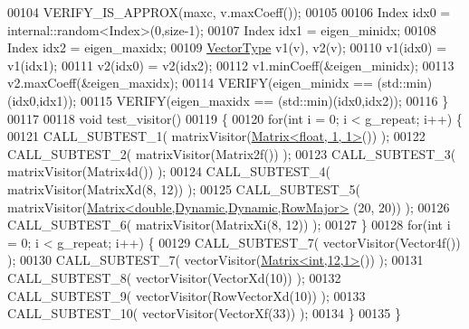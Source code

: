 \begin{DoxyCode}
00104   VERIFY\_IS\_APPROX(maxc, v.maxCoeff());
00105   
00106   Index idx0 = internal::random<Index>(0,size-1);
00107   Index idx1 = eigen\_minidx;
00108   Index idx2 = eigen\_maxidx;
00109   \hyperlink{struct_vector_type}{VectorType} v1(v), v2(v);
00110   v1(idx0) = v1(idx1);
00111   v2(idx0) = v2(idx2);
00112   v1.minCoeff(&eigen\_minidx);
00113   v2.maxCoeff(&eigen\_maxidx);
00114   VERIFY(eigen\_minidx == (std::min)(idx0,idx1));
00115   VERIFY(eigen\_maxidx == (std::min)(idx0,idx2));
00116 \}
00117 
00118 \textcolor{keywordtype}{void} test\_visitor()
00119 \{
00120   \textcolor{keywordflow}{for}(\textcolor{keywordtype}{int} i = 0; i < g\_repeat; i++) \{
00121     CALL\_SUBTEST\_1( matrixVisitor(\hyperlink{group___core___module_class_eigen_1_1_matrix}{Matrix<float, 1, 1>}()) );
00122     CALL\_SUBTEST\_2( matrixVisitor(Matrix2f()) );
00123     CALL\_SUBTEST\_3( matrixVisitor(Matrix4d()) );
00124     CALL\_SUBTEST\_4( matrixVisitor(MatrixXd(8, 12)) );
00125     CALL\_SUBTEST\_5( matrixVisitor(\hyperlink{group___core___module_class_eigen_1_1_matrix}{Matrix<double,Dynamic,Dynamic,RowMajor>}
      (20, 20)) );
00126     CALL\_SUBTEST\_6( matrixVisitor(MatrixXi(8, 12)) );
00127   \}
00128   \textcolor{keywordflow}{for}(\textcolor{keywordtype}{int} i = 0; i < g\_repeat; i++) \{
00129     CALL\_SUBTEST\_7( vectorVisitor(Vector4f()) );
00130     CALL\_SUBTEST\_7( vectorVisitor(\hyperlink{group___core___module_class_eigen_1_1_matrix}{Matrix<int,12,1>}()) );
00131     CALL\_SUBTEST\_8( vectorVisitor(VectorXd(10)) );
00132     CALL\_SUBTEST\_9( vectorVisitor(RowVectorXd(10)) );
00133     CALL\_SUBTEST\_10( vectorVisitor(VectorXf(33)) );
00134   \}
00135 \}
\end{DoxyCode}

